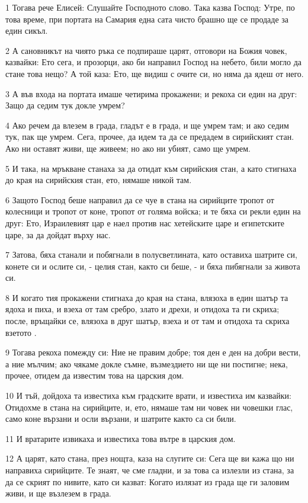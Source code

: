 \par 1 Тогава рече Елисей: Слушайте Господното слово. Така казва Господ: Утре, по това време, при портата на Самария една сата чисто брашно ще се продаде за един сикъл.
\par 2 А сановникът на чиято ръка се подпираше царят, отговори на Божия човек, казвайки: Ето сега, и прозорци, ако би направил Господ на небето, били могло да стане това нещо? А той каза: Ето, ще видиш с очите си, но няма да ядеш от него.
\par 3 А във входа на портата имаше четирима прокажени; и рекоха си един на друг: Защо да седим тук докле умрем?
\par 4 Ако речем да влезем в града, гладът е в града, и ще умрем там; и ако седим тук, пак ще умрем. Сега, прочее, да идем та да се предадем в сирийският стан. Ако ни оставят живи, ще живеем; но ако ни убият, само ще умрем.
\par 5 И така, на мръкване станаха за да отидат към сирийския стан, а като стигнаха до края на сирийския стан, ето, нямаше никой там.
\par 6 Защото Господ беше направил да се чуе в стана на сирийците тропот от колесници и тропот от коне, тропот от голяма войска; и те бяха си рекли един на друг: Ето, Израилевият цар е наел против нас хетейските царе и египетските царе, за да дойдат върху нас.
\par 7 Затова, бяха станали и побягнали в полусветлината, като оставиха шатрите си, конете си и ослите си, - целия стан, както си беше, - и бяха пибягнали за живота си.
\par 8 И когато тия прокажени стигнаха до края на стана, влязоха в един шатър та ядоха и пиха, и взеха от там сребро, злато и дрехи, и отидоха та ги скриха; после, връщайки се, влязоха в друг шатър, взеха и от там и отидоха та скриха взетото .
\par 9 Тогава рекоха помежду си: Ние не правим добре; тоя ден е ден на добри вести, а ние мълчим; ако чякаме докле съмне, възмездието ни ще ни постигне; нека, прочее, отидем да известим това на царския дом.
\par 10 И тъй, дойдоха та известиха към градските врати, и известиха им казвайки: Отидохме в стана на сирийците, и, ето, нямаше там ни човек ни човешки глас, само коне вързани и осли вързани, и шатрите както са си били.
\par 11 И вратарите извикаха и известиха това вътре в царския дом.
\par 12 А царят, като стана, през нощта, каза на слугите си: Сега ще ви кажа що ни направиха сирийците. Те знаят, че сме гладни, и за това са излезли из стана, за да се скрият по нивите, като си казват: Когато излязат из града ще ги заловим живи, и ще възлезем в града.
